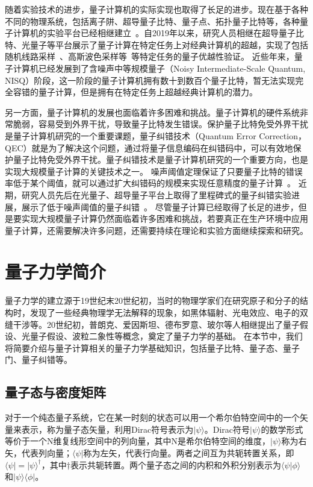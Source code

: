随着实验技术的进步，量子计算机的实际实现也取得了长足的进步。现在基于各种不同的物理系统，包括离子阱、超导量子比特、量子点、拓扑量子比特等，各种量子计算机的实验平台已经相继建立~\cite{blatt2008quantum,devoret2013superconducting,wallraff2004strong,loss1998quantum}。自2019年以来，研究人员相继在超导量子比特、光量子等平台展示了量子计算在特定任务上对经典计算机的超越，实现了包括随机线路采样~\cite{arute2019quantum}、高斯波色采样等~\cite{zhong2020quantum}等特定任务的量子优越性验证。
近些年来，量子计算机已经发展到了含噪声中等规模量子（Noisy Intermediate-Scale Quantum, NISQ）阶段，这一阶段的量子计算机拥有数十到数百个量子比特，暂无法实现完全容错的量子计算，但是拥有在特定任务上超越经典计算机的潜力。

另一方面，量子计算机的发展也面临着许多困难和挑战。量子计算机的硬件系统非常脆弱，容易受到外界干扰，导致量子比特发生错误。保护量子比特免受外界干扰是量子计算机研究的一个重要课题，量子纠错技术（Quantum Error Correction，QEC）就是为了解决这个问题，通过将量子信息编码在纠错码中，可以有效地保护量子比特免受外界干扰。量子纠错技术是量子计算机研究的一个重要方向，也是实现大规模量子计算的关键技术之一。
噪声阈值定理保证了只要量子比特的错误率低于某个阈值，就可以通过扩大纠错码的规模来实现任意精度的量子计算~\cite{aharonov1997fault,aliferis2008fault}。
近期，研究人员先后在光量子、超导量子平台上取得了里程碑式的量子纠错实验进展，展示了低于噪声阈值的量子纠错~\cite{ni2023beating,acharya2024quantum,sivak2023real}。
尽管量子计算已经取得了长足的进步，但是要实现大规模量子计算仍然面临着许多困难和挑战，若要真正在生产环境中应用量子计算，还需要解决许多问题，还需要持续在理论和实验方面继续探索和研究。


\section{量子力学简介}
量子力学的建立源于19世纪末20世纪初，当时的物理学家们在研究原子和分子的结构时，发现了一些经典物理学无法解释的现象，如黑体辐射、光电效应、电子的双缝干涉等。20世纪初，普朗克、爱因斯坦、德布罗意、玻尔等人相继提出了量子假设、光量子假设、波粒二象性等概念，奠定了量子力学的基础。
在本节中，我们将简要介绍与量子计算相关的量子力学基础知识，包括量子比特、量子态、量子门、量子纠错等。

\subsection{量子态与密度矩阵}

对于一个纯态量子系统，它在某一时刻的状态可以用一个希尔伯特空间中的一个矢量来表示，称为量子态矢量，利用Dirac符号表示为$|\psi\rangle$。Dirac符号$|\psi\rangle$的数学形式等价于一个N维复线形空间中的列向量，其中N是希尔伯特空间的维度，$|\psi\rangle$称为右矢，代表列向量；$\langle\psi|$称为左矢，代表行向量。两者之间互为共轭转置关系，即$\langle\psi| = |\psi\rangle^\dagger$，其中$\dagger$表示共轭转置。两个量子态之间的内积和外积分别表示为$\langle\psi|\phi\rangle$和$|\psi\rangle\langle\phi|$。

